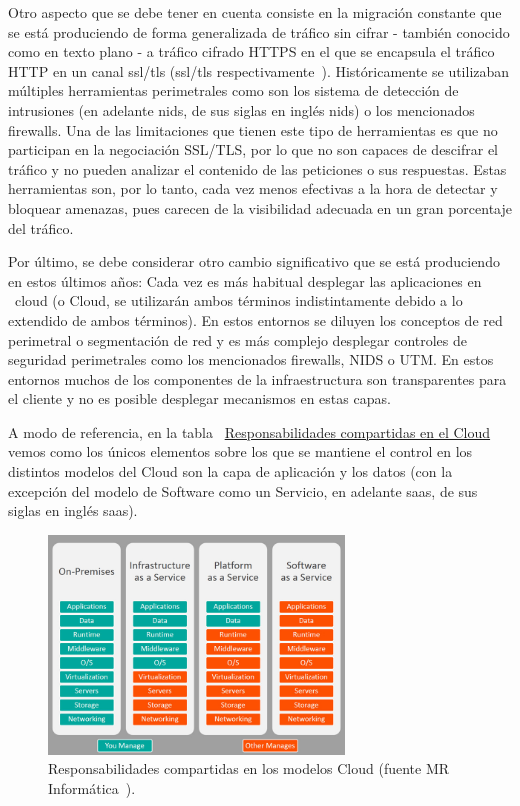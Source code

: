 \par Otro aspecto que se debe tener en cuenta consiste en la migración constante que se está produciendo de forma generalizada de tráfico sin cifrar - también
conocido como en texto plano - a tráfico cifrado HTTPS en el que se encapsula el tráfico HTTP en un canal \acrshort{ssl}/\acrshort{tls}
(\acrlong{ssl}/\acrlong{tls} respectivamente~\cite{wiki:ssltls}). Históricamente se utilizaban múltiples herramientas perimetrales como son los sistema de
detección de intrusiones (en adelante \acrshort{nids}, de sus siglas en inglés \acrlong{nids}) o los mencionados firewalls. Una de las limitaciones que tienen
este tipo de herramientas es que no participan en la negociación SSL/TLS, por lo que no son capaces de descifrar el tráfico y no pueden analizar el contenido de
las peticiones o sus respuestas. Estas herramientas son, por lo tanto, cada vez menos efectivas a la hora de detectar y bloquear amenazas, pues carecen de la
visibilidad adecuada en un gran porcentaje del tráfico.
\par Por último, se debe considerar otro cambio significativo que se está produciendo en estos últimos años: Cada vez es más habitual desplegar las aplicaciones
en ~\gls{cloud} (o Cloud, se utilizarán ambos términos indistintamente debido a lo extendido de ambos términos). En estos entornos se diluyen los conceptos de
red perimetral o segmentación de red y es más complejo desplegar controles de seguridad perimetrales como los mencionados firewalls, NIDS o UTM. En estos
entornos muchos de los componentes de la infraestructura son transparentes para el cliente y no es posible desplegar mecanismos en estas capas.
\par A modo de referencia, en la tabla {~\hyperref[fig:Responsabilidadescloud]{Responsabilidades compartidas en el Cloud}} vemos como los únicos elementos sobre
los que se mantiene el control en los distintos modelos del Cloud son la capa de aplicación y los datos (con la excepción del modelo de Software como un
Servicio, en adelante \acrshort{saas}, de sus siglas en inglés \acrlong{saas}).
\begin{figure}[hp]
  \centering
  \label{fig:Responsabilidadescloud}
  \includegraphics[width=0.7\textwidth]{fig/Responsabilidadescloud}
  \caption{Responsabilidades compartidas en los modelos Cloud (fuente MR Informática~\cite{Responsabilidadescloud}).}
\end{figure}

